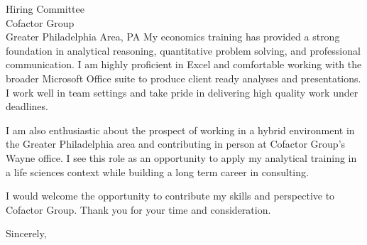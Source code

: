\documentclass[11pt]{letter}
\begin{document}
\begin{letter}{Hiring Committee \\ Cofactor Group \\ Greater Philadelphia Area, PA}
My economics training has provided a strong foundation in analytical reasoning, quantitative problem solving, and professional communication. I am highly proficient in Excel and comfortable working with the broader Microsoft Office suite to produce client ready analyses and presentations. I work well in team settings and take pride in delivering high quality work under deadlines.

I am also enthusiastic about the prospect of working in a hybrid environment in the Greater Philadelphia area and contributing in person at Cofactor Group’s Wayne office. I see this role as an opportunity to apply my analytical training in a life sciences context while building a long term career in consulting.

I would welcome the opportunity to contribute my skills and perspective to Cofactor Group. Thank you for your time and consideration.

\closing{Sincerely,}

\end{letter}
\end{document}
